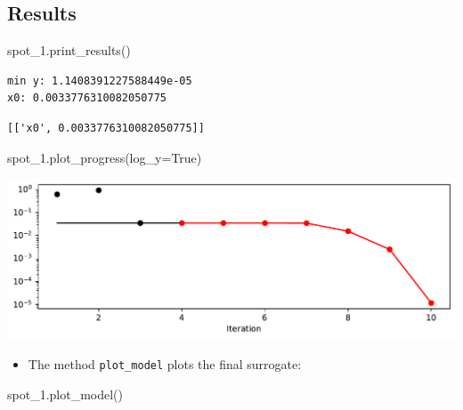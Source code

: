 \documentclass[
  letterpaper,
  DIV=11,
  numbers=noendperiod]{scrreprt}
\newenvironment{Shaded}{\begin{snugshade}}{\end{snugshade}}
\newcommand{\NormalTok}[1]{\textcolor[rgb]{0.00,0.23,0.31}{#1}}
\newcommand{\OperatorTok}[1]{\textcolor[rgb]{0.37,0.37,0.37}{#1}}
\newcommand{\VariableTok}[1]{\textcolor[rgb]{0.07,0.07,0.07}{#1}}
\providecommand{\tightlist}{%
  \setlength{\itemsep}{0pt}\setlength{\parskip}{0pt}}\usepackage{longtable,booktabs,array}
\begin{document}
\subsection{Results}\label{results-5}

\begin{Shaded}
\begin{Highlighting}[]
\NormalTok{spot\_1.print\_results()}
\end{Highlighting}
\end{Shaded}

\begin{verbatim}
min y: 1.1408391227588449e-05
x0: 0.0033776310082050775
\end{verbatim}

\begin{verbatim}
[['x0', 0.0033776310082050775]]
\end{verbatim}

\begin{Shaded}
\begin{Highlighting}[]
\NormalTok{spot\_1.plot\_progress(log\_y}\OperatorTok{=}\VariableTok{True}\NormalTok{)}
\end{Highlighting}
\end{Shaded}

\includegraphics{010_num_spot_sklearn_surrogate_files/figure-pdf/cell-22-output-1.pdf}

\begin{itemize}
\tightlist
\item
  The method \texttt{plot\_model} plots the final surrogate:
\end{itemize}

\begin{Shaded}
\begin{Highlighting}[]
\NormalTok{spot\_1.plot\_model()}
\end{Highlighting}
\end{Shaded}
\end{document}
